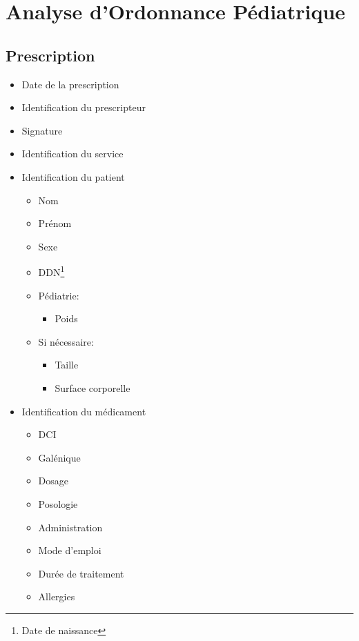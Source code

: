 \documentclass[11pt]{article}
\begin{document}
\section{Analyse d'Ordonnance Pédiatrique}
\label{sec:orgdce5870}
\setlength{\parindent}{0pt}
\subsection{Prescription}
\label{sec:orgffa90c2}
\begin{itemize}
\item Date de la prescription
\item Identification du prescripteur
\item Signature
\item Identification du service
\item Identification du patient
\begin{itemize}
\item Nom
\item Prénom
\item Sexe
\item DDN\footnote{Date de naissance}
\item Pédiatrie:
\begin{itemize}
\item Poids
\end{itemize}
\item Si nécessaire:
\begin{itemize}
\item Taille
\item Surface corporelle
\end{itemize}
\end{itemize}
\item Identification du médicament
\begin{itemize}
\item DCI
\item Galénique
\item Dosage
\item Posologie
\item Administration
\item Mode d'emploi
\item Durée de traitement
\item Allergies
\end{itemize}
\end{itemize}
\end{document}
